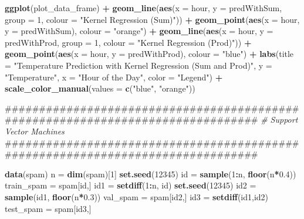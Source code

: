 \documentclass[]{article}
\newenvironment{Shaded}{\begin{snugshade}}{\end{snugshade}}
\newcommand{\KeywordTok}[1]{\textcolor[rgb]{0.13,0.29,0.53}{\textbf{#1}}}
\newcommand{\DataTypeTok}[1]{\textcolor[rgb]{0.13,0.29,0.53}{#1}}
\newcommand{\DecValTok}[1]{\textcolor[rgb]{0.00,0.00,0.81}{#1}}
\newcommand{\FloatTok}[1]{\textcolor[rgb]{0.00,0.00,0.81}{#1}}
\newcommand{\StringTok}[1]{\textcolor[rgb]{0.31,0.60,0.02}{#1}}
\newcommand{\CommentTok}[1]{\textcolor[rgb]{0.56,0.35,0.01}{\textit{#1}}}
\newcommand{\OperatorTok}[1]{\textcolor[rgb]{0.81,0.36,0.00}{\textbf{#1}}}
\newcommand{\NormalTok}[1]{#1}
\begin{document}
\begin{Shaded}
\begin{Highlighting}[]
{{{{{{{{{{\KeywordTok{ggplot}\NormalTok{(plot_data_frame) }\OperatorTok{+}
\StringTok{  }\KeywordTok{geom_line}\NormalTok{(}\KeywordTok{aes}\NormalTok{(}\DataTypeTok{x =}\NormalTok{ hour, }\DataTypeTok{y =}\NormalTok{ predWithSum, }\DataTypeTok{group =} \DecValTok{1}\NormalTok{,}
                \DataTypeTok{colour =} \StringTok{"Kernel Regression (Sum)"}\NormalTok{)) }\OperatorTok{+}
\StringTok{  }\KeywordTok{geom_point}\NormalTok{(}\KeywordTok{aes}\NormalTok{(}\DataTypeTok{x =}\NormalTok{ hour, }\DataTypeTok{y =}\NormalTok{ predWithSum), }\DataTypeTok{colour =} \StringTok{"orange"}\NormalTok{) }\OperatorTok{+}
\StringTok{  }\KeywordTok{geom_line}\NormalTok{(}\KeywordTok{aes}\NormalTok{(}\DataTypeTok{x =}\NormalTok{ hour, }\DataTypeTok{y =}\NormalTok{ predWithProd, }\DataTypeTok{group =} \DecValTok{1}\NormalTok{,}
                \DataTypeTok{colour =} \StringTok{"Kernel Regression (Prod)"}\NormalTok{)) }\OperatorTok{+}
\StringTok{  }\KeywordTok{geom_point}\NormalTok{(}\KeywordTok{aes}\NormalTok{(}\DataTypeTok{x =}\NormalTok{ hour, }\DataTypeTok{y =}\NormalTok{ predWithProd), }\DataTypeTok{colour =} \StringTok{"blue"}\NormalTok{) }\OperatorTok{+}
\StringTok{  }\KeywordTok{labs}\NormalTok{(}\DataTypeTok{title =} \StringTok{"Temperature Prediction with Kernel Regression (Sum and Prod)"}\NormalTok{,}
       \DataTypeTok{y =} \StringTok{"Temperature"}\NormalTok{, }\DataTypeTok{x =} \StringTok{"Hour of the Day"}\NormalTok{, }\DataTypeTok{color =} \StringTok{"Legend"}\NormalTok{) }\OperatorTok{+}
\StringTok{  }\KeywordTok{scale_color_manual}\NormalTok{(}\DataTypeTok{values =} \KeywordTok{c}\NormalTok{(}\StringTok{"blue"}\NormalTok{, }\StringTok{"orange"}\NormalTok{))}


\NormalTok{################################################################################}
\CommentTok{# Support Vector Machines}
\NormalTok{################################################################################}

\KeywordTok{data}\NormalTok{(spam)}
\NormalTok{n =}\StringTok{ }\KeywordTok{dim}\NormalTok{(spam)[}\DecValTok{1}\NormalTok{]}
\KeywordTok{set.seed}\NormalTok{(}\DecValTok{12345}\NormalTok{)}
\NormalTok{id =}\StringTok{ }\KeywordTok{sample}\NormalTok{(}\DecValTok{1}\OperatorTok{:}\NormalTok{n, }\KeywordTok{floor}\NormalTok{(n}\OperatorTok{*}\FloatTok{0.4}\NormalTok{))}
\NormalTok{train_spam =}\StringTok{ }\NormalTok{spam[id,]}
\NormalTok{id1 =}\StringTok{ }\KeywordTok{setdiff}\NormalTok{(}\DecValTok{1}\OperatorTok{:}\NormalTok{n, id)}
\KeywordTok{set.seed}\NormalTok{(}\DecValTok{12345}\NormalTok{)}
\NormalTok{id2 =}\StringTok{ }\KeywordTok{sample}\NormalTok{(id1, }\KeywordTok{floor}\NormalTok{(n}\OperatorTok{*}\FloatTok{0.3}\NormalTok{))}
\NormalTok{val_spam =}\StringTok{ }\NormalTok{spam[id2,]}
\NormalTok{id3 =}\StringTok{ }\KeywordTok{setdiff}\NormalTok{(id1,id2)}
\NormalTok{test_spam =}\StringTok{ }\NormalTok{spam[id3,]}

}}}}}}}}}}
\end{Highlighting}
\end{Shaded}
\end{document}
